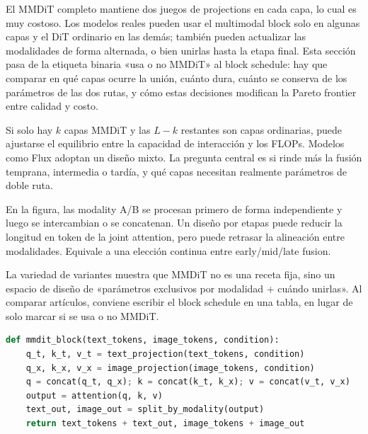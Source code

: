 El MMDiT completo mantiene dos juegos de projections en cada capa, lo cual es muy costoso. Los modelos reales pueden usar el multimodal block solo en algunas capas y el DiT ordinario en las demás; también pueden actualizar las modalidades de forma alternada, o bien unirlas hasta la etapa final. Esta sección pasa de la etiqueta binaria «usa o no MMDiT» al block schedule: hay que comparar en qué capas ocurre la unión, cuánto dura, cuánto se conserva de los parámetros de las dos rutas, y cómo estas decisiones modifican la Pareto frontier entre calidad y costo.


Si solo hay $k$ capas MMDiT y las $L-k$ restantes son capas ordinarias, puede ajustarse el equilibrio entre la capacidad de interacción y los FLOPs. Modelos como Flux adoptan un diseño mixto. La pregunta central es si rinde más la fusión temprana, intermedia o tardía, y qué capas necesitan realmente parámetros de doble ruta.


En la figura, las modality A/B se procesan primero de forma independiente y luego se intercambian o se concatenan. Un diseño por etapas puede reducir la longitud en token de la joint attention, pero puede retrasar la alineación entre modalidades. Equivale a una elección continua entre early/mid/late fusion.


La variedad de variantes muestra que MMDiT no es una receta fija, sino un espacio de diseño de «parámetros exclusivos por modalidad + cuándo unirlas». Al comparar artículos, conviene escribir el block schedule en una tabla, en lugar de solo marcar si se usa o no MMDiT.

\begin{lstlisting}[language=Python,caption={MMDiT block: QKV independientes, attention conjunta y división posterior por modalidad}]
def mmdit_block(text_tokens, image_tokens, condition):
    q_t, k_t, v_t = text_projection(text_tokens, condition)
    q_x, k_x, v_x = image_projection(image_tokens, condition)
    q = concat(q_t, q_x); k = concat(k_t, k_x); v = concat(v_t, v_x)
    output = attention(q, k, v)
    text_out, image_out = split_by_modality(output)
    return text_tokens + text_out, image_tokens + image_out
\end{lstlisting}

